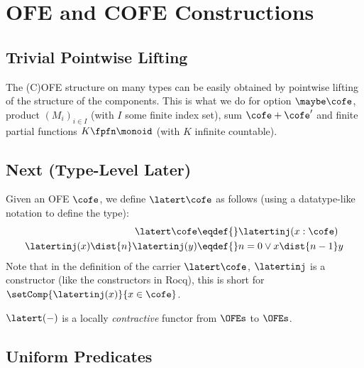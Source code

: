 \section{OFE and COFE Constructions}

\subsection{Trivial Pointwise Lifting}

The (C)OFE structure on many types can be easily obtained by pointwise lifting of the structure of the components.
This is what we do for option $\maybe\cofe$, product $(M_i)_{i \in I}$ (with $I$ some finite index set), sum $\cofe + \cofe'$ and finite partial functions $K \fpfn \monoid$ (with $K$ infinite countable).

\subsection{Next (Type-Level Later)}

Given an OFE $\cofe$, we define $\latert\cofe$ as follows (using a datatype-like notation to define the type):
\begin{align*}
  \latert\cofe \eqdef{}& \latertinj(x:\cofe) \\
  \latertinj(x) \dist{n} \latertinj(y) \eqdef{}& n = 0 \lor x \dist{n-1} y
\end{align*}
Note that in the definition of the carrier $\latert\cofe$, $\latertinj$ is a constructor (like the constructors in Rocq), \ie this is short for $\setComp{\latertinj(x)}{x \in \cofe}$.

$\latert(-)$ is a locally \emph{contractive} functor from $\OFEs$ to $\OFEs$.


\subsection{Uniform Predicates}

